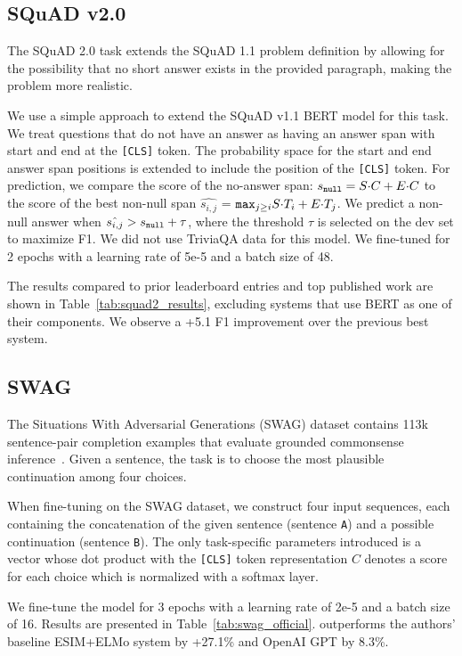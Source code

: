 \subsection{SQuAD v2.0}

The SQuAD 2.0 task extends the SQuAD 1.1 problem definition by allowing for the possibility that no short answer exists in the provided paragraph, making the problem more realistic.

We use a simple approach to extend the SQuAD v1.1 BERT model for this task. We treat questions that do not have an answer as having an answer span with start and end at the {\tt [CLS]} token. The probability space for the start and end answer span positions is extended to include the position of the {\tt [CLS]} token. For prediction, we compare the score of the no-answer span: $s_{\tt null} = S{\cdot}C + E{\cdot}C$ to the score of the best non-null span $\hat{s_{i,j}}$ =  $ {\tt max}_{j \geq i} S{\cdot}T_i + E{\cdot}T_j$. We predict a non-null answer when  $\hat{s_{i,j}} > s_{\tt null} + \tau $, where the threshold $\tau$ is selected on the dev set to maximize F1. We did not use TriviaQA data for this model. We fine-tuned for 2 epochs with a learning rate of 5e-5 and a batch size of 48.

The results compared to prior leaderboard entries and top published work \cite{unet,slqa} are shown in Table~\ref{tab:squad2_results}, excluding systems that use BERT as one of their components. We observe a +5.1 F1 improvement over the previous best system.

\subsection{SWAG}
\label{sec:swag}
The Situations With Adversarial Generations (SWAG) dataset contains 113k sentence-pair completion examples that evaluate grounded commonsense inference~\cite{zellers2018swag}. Given a sentence, the task is to choose the most plausible continuation among four choices.

When fine-tuning on the SWAG dataset, we construct four input sequences, each containing the concatenation of the given sentence (sentence {\tt A}) and a possible continuation (sentence {\tt B}). The only task-specific parameters introduced is a vector whose dot product with the {\tt [CLS]} token representation $C$ denotes a score for each choice which is normalized with a softmax layer.

We fine-tune the model for 3 epochs with a learning rate of 2e-5 and a batch size of 16. Results are presented in Table~\ref{tab:swag_official}. \bertlarge outperforms the authors' baseline ESIM+ELMo system by +27.1\% and OpenAI GPT by 8.3\%.

